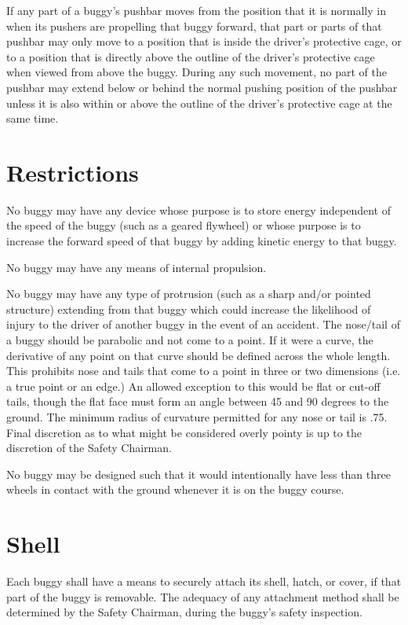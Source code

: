 	If any part of a buggy's pushbar moves from the position that it is normally in
	when its pushers are propelling that buggy forward, that part or parts of that
	pushbar may only move to a position that is inside the driver's protective
	cage, or to a position that is directly above the outline of the driver's
	protective cage when viewed from above the buggy. During any such movement, no
	part of the pushbar may extend below or behind the normal pushing position of
	the pushbar unless it is also within or above the outline of the driver's
	protective cage at the same time.

\section{Restrictions}

	No buggy may have any device whose purpose is to store energy independent of
	the speed of the buggy (such as a geared flywheel) or whose purpose is to
	increase the forward speed of that buggy by adding kinetic energy to that
	buggy.

	No buggy may have any means of internal propulsion.

	No buggy may have any type of protrusion (such as a sharp and/or pointed
	structure) extending from that buggy which could increase the likelihood of
	injury to the driver of another buggy in the event of an accident. The
	nose/tail of a buggy should be parabolic and not come to a point. If it were a
	curve, the derivative of any point on that curve should be defined across the
	whole length. This prohibits nose and tails that come to a point in three or
	two dimensions (i.e. a true point or an edge.) An allowed exception to this
	would be flat or cut-off tails, though the flat face must form an angle between
	45 and 90 degrees to the ground. The minimum radius of curvature permitted for
	any nose or tail is .75. Final discretion as to what might be considered overly
	pointy is up to the discretion of the Safety Chairman.

	No buggy may be designed such that it would intentionally have less than three
	wheels in contact with the ground whenever it is on the buggy course.

\section{Shell}

	Each buggy shall have a means to securely attach its shell, hatch, or cover, if
	that part of the buggy is removable. The adequacy of any attachment method
	shall be determined by the Safety Chairman, during the buggy's safety
	inspection.

